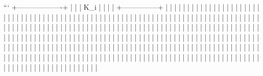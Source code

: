 ```
+-------------------+
|                   |
|  K_i              |
|                   |
|   +---------------+
|   |               |
|   |               |
|   |               |
|   |               |
|   |               |
|   |               |
|   |               |
|   |               |
|   |               |
|   |               |
|   |               |
|   |               |
|   |               |
|   |               |
|   |               |
|   |               |
|   |               |
|   |               |
|   |               |
|   |               |
|   |               |
|   |               |
|   |               |
|   |               |
|   |               |
|   |               |
|   |               |
|   |               |
|   |               |
|   |               |
|   |               |
|   |               |
|   |               |
|   |               |
|   |               |
|   |               |
|   |               |
|   |               |
|   |               |
|   |               |
|   |               |
|   |               |
|   |               |
|   |               |
|   |               |
|   |               |
|   |               |
|   |               |
|   |               |
|   |               |
|   |               |
|   |               |
|   |               |
|   |               |
|   |               |
|   |               |
|   |               |
|   |               |
|   |               |
|   |               |
|   |               |
|   |               |
|   |               |
|   |               |
|   |               |
|   |               |
|   |               |
|   |               |
|   |               |
|   |               |
|   |               |
|   |               |
|   |               |
|   |               |
|   |               |
|   |               |
|   |               |
|   |               |
|   |               |
|   |               |
|   |               |
|   |               |
|   |               |
|   |               |
|   |               |
|   |               |
|   |               |
|   |               |
|   |               |
|   |               |
|   |               |
|   |               |
|   |               |
|   |               |
|   |               |
|   |               |
|   |               |
|   |               |
|   |               |
|   |               |
|   |               |
|   |               |
|   |               |
|   |               |
|   |               |
|   |               |
|   |               |
|   |               |
|   |               |
|   |               |
|   |               |
|   |               |
|   |               |
